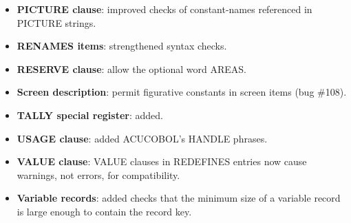 \begin{itemize}
\item \textbf{PICTURE clause}: improved checks of constant-names referenced in PICTURE strings.
\item \textbf{RENAMES items}: strengthened syntax checks.
\item \textbf{RESERVE clause}: allow the optional word AREAS.
\item \textbf{Screen description}: permit figurative constants in screen items (bug \#108).
\item \textbf{TALLY special register}: added.
\item \textbf{USAGE clause}: added ACUCOBOL's HANDLE phrases.
\item \textbf{VALUE clause}: VALUE clauses in REDEFINES entries now cause warnings, not errors, for compatibility.
\item \textbf{Variable records}: added checks that the minimum size of a variable record is large enough to contain the record key.
\end{itemize}

